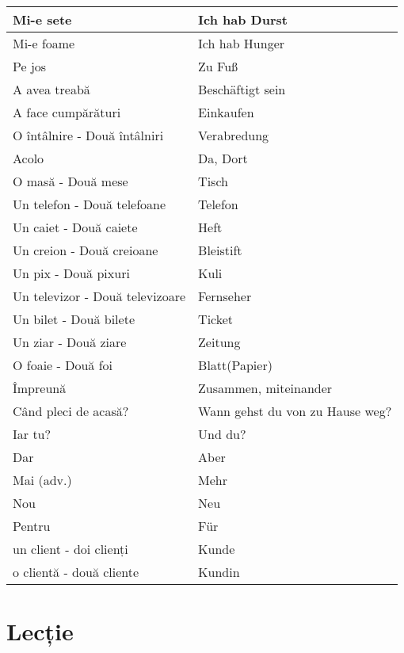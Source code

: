 \documentclass[11pt, oneside]{article}
\begin{document}
\begin{center}
  \begin{tabular}{ | p{6cm}| p{6cm} | } 
    \hline
    Mi-e sete & Ich hab Durst\\
    \hline
    Mi-e foame & Ich hab Hunger\\
    \hline
    Pe jos & Zu Fuß\\
    \hline
    A avea treabă & Beschäftigt sein\\
    \hline
    A face cumpărături & Einkaufen\\
    \hline
    O întâlnire - Două întâlniri & Verabredung\\
    \hline
    Acolo & Da, Dort\\
    \hline
    O masă - Două mese & Tisch\\
    \hline
    Un telefon - Două telefoane & Telefon\\
    \hline
    Un caiet - Două caiete & Heft\\
    \hline
    Un creion - Două creioane & Bleistift\\
    \hline
    Un pix - Două pixuri & Kuli\\
    \hline
    Un televizor - Două televizoare & Fernseher\\
    \hline
    Un bilet - Două bilete & Ticket\\
    \hline
    Un ziar - Două ziare & Zeitung\\
    \hline
    O foaie - Două foi & Blatt(Papier)\\
    \hline
    Împreună & Zusammen, miteinander\\
    \hline
    Când pleci de acasă? & Wann gehst du von zu Hause weg?\\
    \hline
    Iar tu? & Und du?\\
    \hline
    Dar & Aber\\
    \hline
    Mai (adv.) & Mehr\\
    \hline
    Nou & Neu\\
    \hline
    Pentru & Für\\
    \hline
    un client - doi clienți & Kunde\\
    o clientă - două cliente & Kundin\\
    \hline

    \hline
  \end{tabular}
\end{center}
%
\pagebreak
\section{Lecție}
\end{document}
